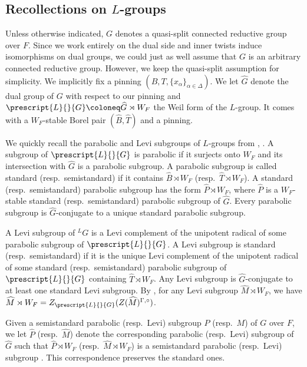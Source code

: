 \documentclass{amsart}
\theoremstyle{definition}
\theoremstyle{remark}
\numberwithin{equation}{section}
\newcommand{\co}[1]{\prescript{#1}{}}
\newcommand{\wh}{\widehat}
\begin{document}
\subsection{Recollections on \texorpdfstring{$L$}{L}-groups}
Unless otherwise indicated, $G$ denotes a quasi-split connected reductive group over $F$. Since we work entirely on the dual side and inner twists induce isomorphisms on dual groups, we could just as well assume that $G$ is an arbitrary connected reductive group. However, we keep the quasi-split assumption for simplicity.  We implicitly fix a pinning $(B, T, \{x_{\alpha}\}_{\alpha \in \Delta})$. We let $\wh{G}$ denote the dual group of $G$ with respect to our pinning and $\co{L}{G} \coloneq \wh{G} \rtimes W_F$ the Weil form of the $L$-group. It comes with a $W_F$-stable Borel pair $(\wh{B}, \wh{T})$ and a pinning. 

We quickly recall the parabolic and Levi subgroups of $L$-groups from \cite[\S 3.3, 3.4]{Bor2}, \cite[\S 2.5]{SilbergerZink}. A subgroup of $\co{L}{G}$ is parabolic if it surjects onto $W_F$ and its intersection with $\wh{G}$ is a parabolic subgroup. A parabolic subgroup is called standard (resp.~semistandard) if it contains $\wh{B}\rtimes W_F$ (resp.~$\wh{T}\rtimes W_F$). A standard (resp.~semistandard) parabolic subgroup has the form $\wh{P}\rtimes W_F$, where $\wh{P}$ is a $W_F$-stable standard (resp.~semistandard) parabolic subgroup of $\wh{G}$. Every parabolic subgroup is $\wh{G}$-conjugate to a unique standard parabolic subgroup.  

A Levi subgroup of ${}^L G$ is a Levi complement of the unipotent radical of some parabolic subgroup of $\co{L}{G}$. A Levi subgroup is standard (resp.~semistandard) if it is the unique Levi complement of the unipotent radical of some standard (resp.~semistandard) parabolic subgroup of $\co{L}{G}$ containing $\wh{T}\rtimes W_F$. Any Levi subgroup is $\wh{G}$-conjugate to at least one standard Levi subgroup. By \cite[Lemma 3.5]{Bor2}, for any Levi subgroup $\wh M\rtimes W_F$, we have $\wh M\rtimes W_F =Z_{\co{L}{G}}(Z(\wh M)^{\Gamma,\circ})$.  

Given a semistandard parabolic (resp.~Levi) subgroup $P$ (resp.~$M$) of $G$ over $F$, we let $\wh{P}$ (resp.~$\wh{M}$) denote the corresponding parabolic (resp.~Levi) subgroup of $\wh{G}$ such that $\wh{P}\rtimes W_F$ (resp.~$\wh{M}\rtimes W_F$) is a semistandard parabolic (resp.~Levi) subgroup \cite[Proposition 2.5.4 (i)]{SilbergerZink}. This correspondence preserves the standard ones. 
\end{document}
